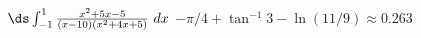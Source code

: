 {$\ds \int_{-1}^1 \frac{x^2+5x-5}{(x-10)(x^2+4x+5)}\ dx$}
{$-\pi/4+\tan^{-1} 3 - \ln (11/9) \approx 0.263$}
